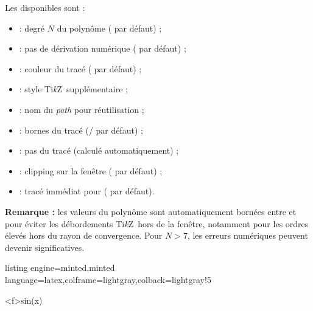 \documentclass[11pt,a4paper]{ltxdoc}
\providecommand\tikzlogo{Ti\textit{k}Z}
\let\TikZ\tikzlogo
\begin{document}
Les  disponibles sont :

\begin{itemize}
  \item {} : degré $N$ du polynôme ( par défaut) ;
  \item {} : pas de dérivation numérique ( par défaut) ;
  \item {} : couleur du tracé ( par défaut) ;
  \item {} : style \TikZ\ supplémentaire ;
  \item {} : nom du \textit{path} pour réutilisation ;
  \item {} : bornes du tracé (/ par défaut) ;
  \item {} : pas du tracé (calculé automatiquement) ;
  \item {} : clipping sur la fenêtre ( par défaut) ;
  \item {} : tracé immédiat pour  ( par défaut).
\end{itemize}

\medskip

\textbf{Remarque :} les valeurs du polynôme sont automatiquement bornées entre  et  pour éviter les débordements \TikZ\ hors de la fenêtre, notamment pour les ordres élevés hors du rayon de convergence. Pour $N > 7$, les erreurs numériques peuvent devenir significatives.

\begin{tcblisting}{listing engine=minted,minted language=latex,colframe=lightgray,colback=lightgray!5}
\begin{GraphiqueTikz}[x=1cm,y=1cm,Xmin=-5,Xmax=5,Ymin=-3,Ymax=3]
  \DefinirCourbe[Trace,Couleur=black]<f>{sin(x)}
\end{GraphiqueTikz}
\end{tcblisting}
\end{document}
